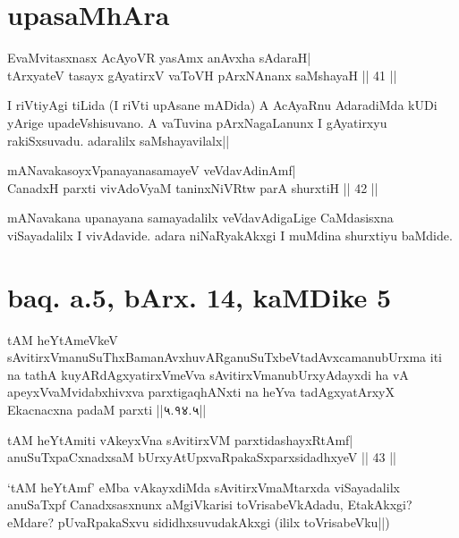 \section*{upasaMhAra}

\begin{shl}
EvaMvitasxnasx AcAyoVR yasAmx anAvxha sAdaraH| \\
tArxyateV tasayx gAyatirxV vaToVH pArxNAnanx saMshayaH \hfill ||  41 || 
\end{shl}

\begin{artha} 
I riVtiyAgi tiLida (I riVti upAsane mADida) A AcAyaRnu AdaradiMda kUDi 
yArige upadeVshisuvano. A vaTuvina pArxNagaLanunx I gAyatirxyu 
rakiSxsuvadu. adaralilx saMshayavilalx||
\end{artha}


\begin{shl}
mANavakasoyxVpanayanasamayeV veVdavAdinAmf| \\
CanadxH parxti vivAdoV\s yaM taninxNiVRtw parA shurxtiH \hfill ||  42 || 
\end{shl}

\begin{artha} 
mANavakana upanayana samayadalilx veVdavAdigaLige CaMdasisxna 
viSayadalilx I vivAdavide. adara niNaRyakAkxgi I muMdina shurxtiyu 
baMdide.
\end{artha}

\section*{baq. a.5, bArx. 14, kaMDike 5}

\begin{shl}
tAM heYtAmeVkeV sAvitirxVmanuSuThxBamanAvxhuvARganuSuTxbeVtadAvxcamanubUrxma iti na tathA kuyARdAgxyatirxVmeVva sAvitirxVmanubUrxyAdayxdi ha vA apeyxVvaMvidabxhivxva parxtigaqhANxti na heYva tadAgxyatArxyX Ekacnacxna padaM parxti ||५.१४.५||
\end{shl}

\stext

\begin{shl}
tAM heYtAmiti vAkeyxVna sAvitirxVM parxtidashayxRtAmf| \\
anuSuTxpaCxnadxsaM bUrxyAtUpxvaRpakaSxparxsidadhxyeV \hfill ||  43 || 
\end{shl}

\begin{artha} 
`tAM heYtAmf' eMba vAkayxdiMda sAvitirxVmaMtarxda viSayadalilx 
anuSaTxpf Canadxsasxnunx aMgiVkarisi toVrisabeVkAdadu, EtakAkxgi? 
eMdare? pUvaRpakaSxvu sididhxsuvudakAkxgi (ililx toVrisabeVku||)
\end{artha}

